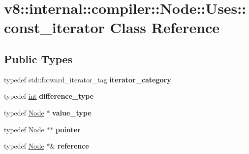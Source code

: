 \hypertarget{classv8_1_1internal_1_1compiler_1_1Node_1_1Uses_1_1const__iterator}{}\section{v8\+:\+:internal\+:\+:compiler\+:\+:Node\+:\+:Uses\+:\+:const\+\_\+iterator Class Reference}
\label{classv8_1_1internal_1_1compiler_1_1Node_1_1Uses_1_1const__iterator}
\subsection*{Public Types}
\begin{DoxyCompactItemize}
\item 
\mbox{\label{classv8_1_1internal_1_1compiler_1_1Node_1_1Uses_1_1const__iterator_a547082e47066856751da8e1d7fcde376}} 
typedef std\+::forward\+\_\+iterator\+\_\+tag {\bfseries iterator\+\_\+category}
\item 
\mbox{\label{classv8_1_1internal_1_1compiler_1_1Node_1_1Uses_1_1const__iterator_a90a9134ba510c5a877c48a172b4a8ae6}} 
typedef \mbox{\hyperlink{classint}{int}} {\bfseries difference\+\_\+type}
\item 
\mbox{\label{classv8_1_1internal_1_1compiler_1_1Node_1_1Uses_1_1const__iterator_ae0631a3a013263b68fa9f8b16e9625f2}} 
typedef \mbox{\hyperlink{classv8_1_1internal_1_1compiler_1_1Node}{Node}} $\ast$ {\bfseries value\+\_\+type}
\item 
\mbox{\label{classv8_1_1internal_1_1compiler_1_1Node_1_1Uses_1_1const__iterator_af77095de352cf3f36dea1dc4ad2b3842}} 
typedef \mbox{\hyperlink{classv8_1_1internal_1_1compiler_1_1Node}{Node}} $\ast$$\ast$ {\bfseries pointer}
\item 
\mbox{\label{classv8_1_1internal_1_1compiler_1_1Node_1_1Uses_1_1const__iterator_ac2ef99c152567762c0f9837a26822dc0}} 
typedef \mbox{\hyperlink{classv8_1_1internal_1_1compiler_1_1Node}{Node}} $\ast$\& {\bfseries reference}
\end{DoxyCompactItemize}
